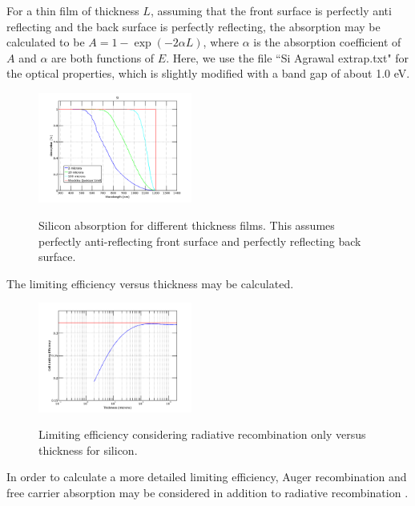 \documentclass[12pt]{article}
\begin{document}
For a thin film of thickness $L$, assuming that the front surface is perfectly anti reflecting and the back surface is perfectly reflecting, the absorption may be calculated to be $A = 1 - \exp(-2 \alpha L)$, where $\alpha$ is the absorption coefficient of $A$ and $\alpha$ are both functions of $E$.  Here, we use the file ``Si Agrawal extrap.txt" for the optical properties, which is slightly modified with a band gap of about 1.0 eV.  
\begin{figure}[H]
\centering
\vspace{-10pt}
{\includegraphics[width=0.45\textwidth]{Figures/SiliconFilmAbsorptionVersusWavelength}} 
 \caption[Silicon absorption for different thickness films]{Silicon absorption for different thickness films.  This assumes perfectly anti-reflecting front surface and perfectly reflecting back surface.}
  \label{fig:absorptionVersusWavelength}
\end{figure}

The limiting efficiency versus thickness may be calculated.  
\begin{figure}[H]
\centering
\vspace{-10pt}
{\includegraphics[width=0.45\textwidth]{Figures/LimitingEfficiencyVersusThickness}} 
 \caption[Limiting efficiency considering radiative recombination]{Limiting efficiency considering radiative recombination only versus thickness for silicon.}
  \label{fig:limitingEfficiencyVersusThickness}
\end{figure}

In order to calculate a more detailed limiting efficiency, Auger recombination and free carrier absorption may be considered in addition to radiative recombination \cite{Tiedje:84}.    
\end{document}

